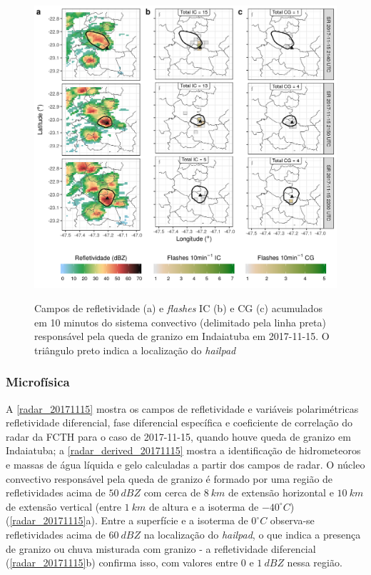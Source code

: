 \begin{figure}[htb]
	\centering
	\caption{Campos de refletividade (a) e \textit{flashes} IC (b) e CG (c) acumulados em 10 minutos do sistema convectivo (delimitado pela linha preta) responsável pela queda de granizo em Indaiatuba em 2017-11-15. O triângulo preto indica a localização do \textit{hailpad}} 
	\label{dbz_flashes_20171115}
	\includegraphics[width=0.99\columnwidth]{../General_Processing/figures/clusters_flashes_2017-11-15_2150_ptbr.png} \\
\end{figure}

\subsubsection{Microfísica}\label{micro_20171115}

A \autoref{radar_20171115} mostra os campos de refletividade e variáveis polarimétricas refletividade diferencial, fase diferencial específica e coeficiente de correlação do radar da FCTH para o caso de 2017-11-15, quando houve queda de granizo em Indaiatuba; a \autoref{radar_derived_20171115} mostra a identificação de hidrometeoros e massas de água líquida e gelo calculadas a partir dos campos de radar. O núcleo convectivo responsável pela queda de granizo é formado por uma região de refletividades acima de $50\:dBZ$ com cerca de $8\:km$ de extensão horizontal e $10\:km$ de extensão vertical (entre $1\:km$ de altura e a isoterma de $-40^{\circ}C$) (\autoref{radar_20171115}a). Entre a superfície e a isoterma de $0^{\circ}C$ observa-se refletividades acima de $60\:dBZ$ na localização do \textit{hailpad}, o que indica a presença de granizo ou chuva misturada com granizo - a refletividade diferencial (\autoref{radar_20171115}b) confirma isso, com valores entre 0 e $1\:dBZ$ nessa região.

